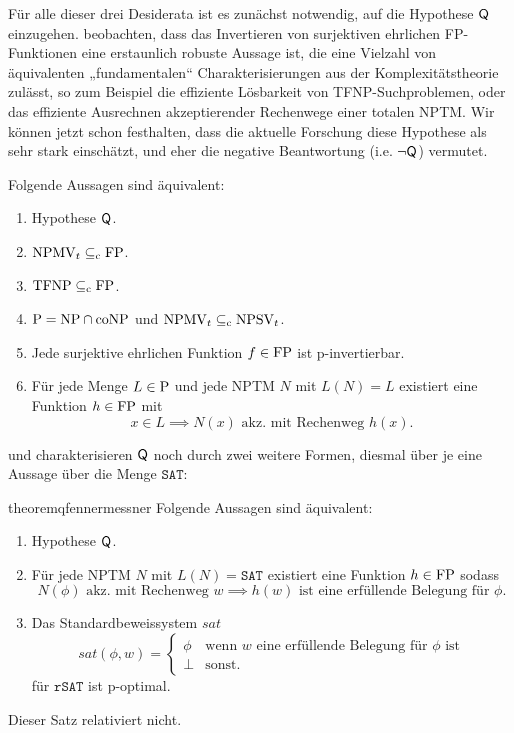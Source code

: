 Für alle dieser drei Desiderata ist es zunächst notwendig, auf die Hypothese $\hQ$ einzugehen.
\textcite{fenner_inverting_2003} beobachten, dass das Invertieren von surjektiven ehrlichen FP-Funktionen eine erstaunlich robuste Aussage ist, die eine Vielzahl von äquivalenten „fundamentalen“ \parencite{fenner_inverting_2003} Charakterisierungen aus der Komplexitätstheorie zulässt, so zum Beispiel die effiziente Lösbarkeit von TFNP-Suchproblemen, oder das effiziente Ausrechnen akzeptierender Rechenwege einer totalen NPTM. Wir können jetzt schon festhalten, dass die aktuelle Forschung diese Hypothese als sehr stark einschätzt, und eher die negative Beantwortung (i.e. $\neg\hQ$) vermutet.


\begin{theorem}\label{thm:q-orig}
    Folgende Aussagen sind äquivalent:
    \begin{enumerate}
        \item Hypothese $\hQ$.
        \item $\mathrm{NPMV}_t\subseteqc \mathrm{FP}$.
        \item $\TFNP\subseteqc \mathrm{FP}$.
        \item $\P=\NP\cap\coNP$ und $\mathrm{NPMV}_t\subseteqc \mathrm{NPSV}_t$.
        \item Jede surjektive ehrlichen Funktion $f\in\FP$ ist p-invertierbar.
        \item Für jede Menge $L\in \P$  und jede NPTM $N$ mit $L(N)=L$ existiert eine Funktion $h\in \FP$ mit 
            \[ x\in L \implies N(x) \text{ akz. mit Rechenweg $h(x)$}. \]
    \end{enumerate}
\end{theorem}

\textcite{fenner_inverting_2003} und \textcite{messner_simulation_2001} charakterisieren $\hQ$ noch durch zwei weitere Formen, diesmal über je eine Aussage über die Menge $\mathtt{SAT}$:

\begin{restatable}{theorem}{qfennermessner}\label{thm:q-fenner-messner}
    Folgende Aussagen sind äquivalent:
\begin{enumerate}[midpenalty=0,endpenalty=10000]
        \item Hypothese $\hQ$.
        \item \parencite{fenner_inverting_2003} Für jede NPTM $N$ mit $L(N)=\mathtt{SAT}$ existiert eine Funktion $h\in \FP$ sodass 
\[ N(\phi) \text{ akz. mit Rechenweg $w$} \implies \text{$h(w)$ ist eine erfüllende Belegung für $\phi$.} \]\pagebreak[2]
             
        \item \parencite{messner_simulation_2001} Das Standardbeweissystem $\mathit{sat}$
            \[ \mathit{sat}(\phi, w) = \begin{cases} \phi & \text{wenn $w$ eine erfüllende Belegung für $\phi$ ist} \\ \bot & \text{sonst.} \end{cases}\]
            für $\mathtt{rSAT}$ ist p-optimal.
    \end{enumerate}
    Dieser Satz relativiert nicht.
\end{restatable}

